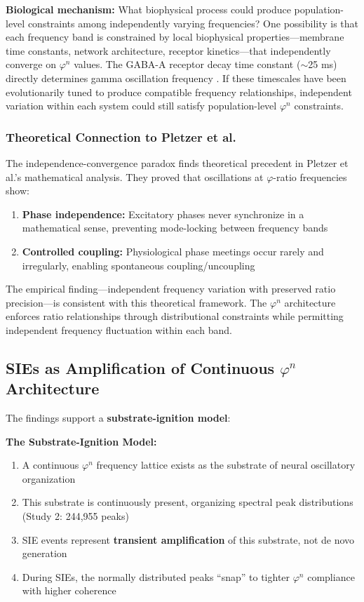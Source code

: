 \documentclass[11pt,a4paper]{article}
\newcommand{\phisym}{\varphi}
\begin{document}
\textbf{Biological mechanism:} What biophysical process could produce population-level constraints among independently varying frequencies? One possibility is that each frequency band is constrained by local biophysical properties---membrane time constants, network architecture, receptor kinetics---that independently converge on $\phisym^n$ values. The GABA-A receptor decay time constant ($\sim$25 ms) directly determines gamma oscillation frequency \parencite{bartos2007synaptic}. If these timescales have been evolutionarily tuned to produce compatible frequency relationships, independent variation within each system could still satisfy population-level $\phisym^n$ constraints.

\subsubsection{Theoretical Connection to Pletzer et al.}

The independence-convergence paradox finds theoretical precedent in Pletzer et al.'s \parencite{pletzer2010golden} mathematical analysis. They proved that oscillations at $\phisym$-ratio frequencies show:
\begin{enumerate}
    \item \textbf{Phase independence:} Excitatory phases never synchronize in a mathematical sense, preventing mode-locking between frequency bands
    \item \textbf{Controlled coupling:} Physiological phase meetings occur rarely and irregularly, enabling spontaneous coupling/uncoupling
\end{enumerate}

The empirical finding---independent frequency variation with preserved ratio precision---is consistent with this theoretical framework. The $\phisym^n$ architecture enforces ratio relationships through distributional constraints while permitting independent frequency fluctuation within each band.

\subsection{SIEs as Amplification of Continuous $\phisym^n$ Architecture}

The findings support a \textbf{substrate-ignition model}:

\begin{keyinsight}
\textbf{The Substrate-Ignition Model:}
\begin{enumerate}
    \item A continuous $\phisym^n$ frequency lattice exists as the substrate of neural oscillatory organization
    \item This substrate is continuously present, organizing spectral peak distributions (Study 2: 244,955 peaks)
    \item SIE events represent \textbf{transient amplification} of this substrate, not de novo generation
    \item During SIEs, the normally distributed peaks ``snap'' to tighter $\phisym^n$ compliance with higher coherence
\end{enumerate}
\end{keyinsight}
\end{document}

